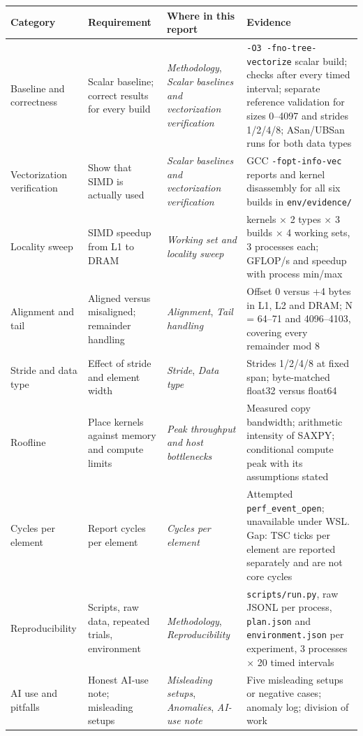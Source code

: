 \documentclass[10pt,letterpaper]{article}
\begin{document}
{\footnotesize\begin{longtable}{>{\raggedright\arraybackslash}p{0.1429\dimexpr\linewidth-8\tabcolsep\relax}>{\raggedright\arraybackslash}p{0.2476\dimexpr\linewidth-8\tabcolsep\relax}>{\raggedright\arraybackslash}p{0.3048\dimexpr\linewidth-8\tabcolsep\relax}>{\raggedright\arraybackslash}p{0.3048\dimexpr\linewidth-8\tabcolsep\relax}}\toprule
\textbf{Category} & \textbf{Requirement} & \textbf{Where in this report} & \textbf{Evidence} \\ \midrule\endhead
Baseline and correctness & Scalar baseline; correct results for every build & \textit{Methodology}, \textit{Scalar baselines and vectorization verification} & \texttt{-O3 -fno-tree-vectorize} scalar build; checks after every timed interval; separate reference validation for sizes 0--4097 and strides 1/2/4/8; ASan/UBSan runs for both data types \\
Vectorization verification & Show that SIMD is actually used & \textit{Scalar baselines and vectorization verification} & GCC \texttt{-fopt-info-vec} reports and kernel disassembly for all six builds in \texttt{env/evidence/} \\
Locality sweep & SIMD speedup from L1 to DRAM & \textit{Working set and locality sweep} & 3 kernels $\times$ 2 types $\times$ 3 builds $\times$ 4 working sets, 3 processes each; GFLOP/s and speedup with process min/max \\
Alignment and tail & Aligned versus misaligned; remainder handling & \textit{Alignment}, \textit{Tail handling} & Offset 0 versus +4 bytes in L1, L2 and DRAM; N = 64--71 and 4096--4103, covering every remainder mod 8 \\
Stride and data type & Effect of stride and element width & \textit{Stride}, \textit{Data type} & Strides 1/2/4/8 at fixed span; byte-matched float32 versus float64 \\
Roofline & Place kernels against memory and compute limits & \textit{Peak throughput and host bottlenecks} & Measured copy bandwidth; arithmetic intensity of SAXPY; conditional compute peak with its assumptions stated \\
Cycles per element & Report cycles per element & \textit{Cycles per element} & Attempted \texttt{perf\_event\_open}; unavailable under WSL. Gap: TSC ticks per element are reported separately and are not core cycles \\
Reproducibility & Scripts, raw data, repeated trials, environment & \textit{Methodology}, \textit{Reproducibility} & \texttt{scripts/run.py}, raw JSONL per process, \texttt{plan.json} and \texttt{environment.json} per experiment, 3 processes $\times$ 20 timed intervals \\
AI use and pitfalls & Honest AI-use note; misleading setups & \textit{Misleading setups}, \textit{Anomalies}, \textit{AI-use note} & Five misleading setups or negative cases; anomaly log; division of work \\
\bottomrule\end{longtable}}
\end{document}
